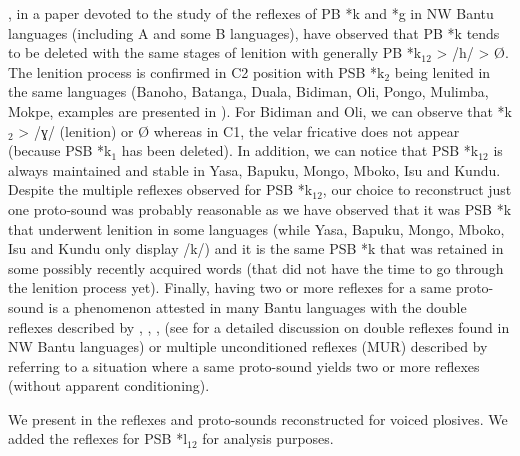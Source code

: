 \documentclass[output=paper,colorlinks,citecolor=brown
]{langscibook}
\begin{document}
\citet{grollemundandphilippsonforth2}, in a paper devoted to the study of the reflexes of PB *k and *g in NW Bantu languages (including A and some B languages), have observed that PB *k tends to be deleted with the same stages of lenition with generally PB *k$_{12}$ > /h/ > Ø. The lenition process is confirmed in C2 position with PSB *k$_2$ being lenited in the same languages (Banoho, Batanga, Duala, Bidiman, Oli, Pongo, Mulimba, Mokpe, examples are presented in ). For Bidiman and Oli, we can observe that *k$_2$ > /ɣ/ (lenition) or Ø whereas in C1, the velar fricative does not appear (because PSB *k$_1$ has been deleted). In addition, we can notice that PSB *k$_{12}$ is always maintained and stable in Yasa, Bapuku, Mongo, Mboko, Isu and Kundu. Despite the multiple reflexes observed for PSB *k$_{12}$, our choice to reconstruct just one proto-sound was probably reasonable as we have observed that it was PSB *k that underwent lenition in some languages (while Yasa, Bapuku, Mongo, Mboko, Isu and Kundu only display /k/) and it is the same PSB *k that was retained in some possibly recently acquired words (that did not have the time to go through the lenition process yet). Finally, having two or more reflexes for a same proto-sound is a phenomenon attested in many Bantu languages with the double reflexes described by \citet{guthriecomparativebantu}, \citet{stewart1973, stewart1975}, \citet{janssens1991, janssens1992}, \citet{vanleynseeleandstewart1980} (see \citealt{philippson2022} for a detailed discussion on double reflexes found in NW Bantu languages) or multiple unconditioned reflexes (MUR) described by \citet{pacchiarottiandbostoen2022} referring to a situation where a same proto-sound yields two or more reflexes (without apparent conditioning).


We present in  the reflexes and proto-sounds reconstructed for voiced plosives. We added the reflexes for PSB *l$_{12}$ for analysis purposes. 
\end{document}
